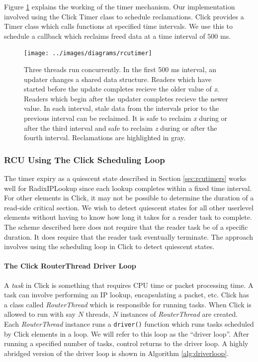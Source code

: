 \documentclass[a4paper]{article}
\begin{document}
Figure \ref{fig:rcutimer} explains the working of the timer mechanism. Our implementation involved using the Click Timer class to schedule reclamations. Click provides a Timer class which calls functions at specified time intervals. We use this to schedule a callback which reclaims freed data at a time interval of $500$ ms.
\begin{figure}[float=tph]
\begin{center}
\texttt{[image: ../images/diagrams/rcutimer]}
\caption{ Three threads run concurrently. In the first 500 ms interval, an updater changes a shared data structure. Readers which have started before the update completes recieve the older value of \emph{x}. Readers which begin after the updater completes recieve the newer value. In each interval, stale data from the intervals prior to the previous interval can be reclaimed. It is safe to reclaim \emph{x} during or after the third interval and safe to reclaim \emph{z} during or after the fourth interval. Reclamations are highlighted in gray.
}
\label{fig:rcutimer}
\end{center}
\end{figure}

\pagebreak
\subsubsection{RCU Using The Click Scheduling Loop}
\label{sec:rcuschedloop}

The timer expiry as a quiescent state described in Section \ref{sec:rcutimers} works well for RadixIPLookup since each lookup completes within a fixed time interval. For other elements in Click, it may not be possible to determine the duration of a read-side critical section. We wish to detect quiescent states for all other userlevel elements without having to know how long it takes for a reader task to complete. The scheme described here does not require that the reader task be of a specific duration. It does require that the reader task eventually terminate. The approach involves using the scheduling loop in Click to detect quiescent states. 

\paragraph{The Click RouterThread Driver Loop}
A \emph{task} in Click is something that requires CPU time or packet processing time. A task can involve performing an IP lookup, encapsulating a packet, etc. Click has a class called \emph{RouterThread} which is responsible for running tasks. When Click is allowed to run with say $N$ threads, $N$ instances of \emph{RouterThread} are created. Each \emph{RouterThread} instance runs a \verb+driver()+ function which runs tasks scheduled by Click elements in a loop. We will refer to this loop as the ``driver loop''. After running a specified number of tasks, control returns to the driver loop. A highly abridged version of the driver loop is shown in Algorithm \ref{alg:driverloop}.
\end{document}
